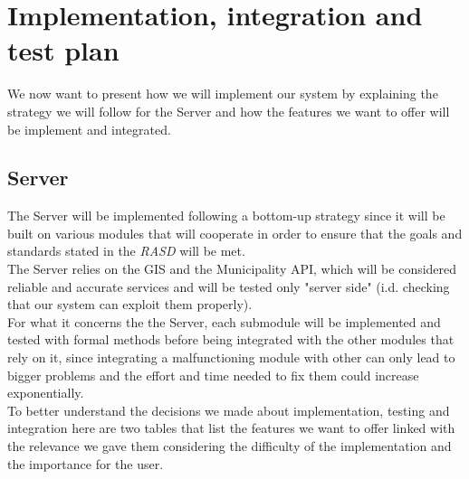 \section{Implementation, integration and test plan}

    
    We now want to present how we will implement our system by explaining the strategy we will follow for the Server
    and how the features we want to offer will be implement and integrated.\\
        
        \subsection{Server}
        The Server will be implemented following a bottom-up strategy since it will be built on various modules that will cooperate in order
        to ensure that the goals and standards stated in the \emph{RASD}\cite{RASD} will be met.\\
        The Server relies on the GIS and the Municipality API, which will be considered reliable and accurate services and will be
        tested only "server side" (i.d. checking that our system can exploit them properly).\\
        For what it concerns the the Server, each submodule will be implemented and tested with formal methods before being integrated 
        with the other modules that rely on it, since integrating a malfunctioning module with other can only lead to bigger problems 
        and the effort and time needed to fix them could increase exponentially.\\
        To better understand the decisions we made about implementation, testing and integration here are two tables that list the features
        we want to offer linked with the relevance we gave them considering the difficulty of the implementation and the importance for 
        the user.\\
        
